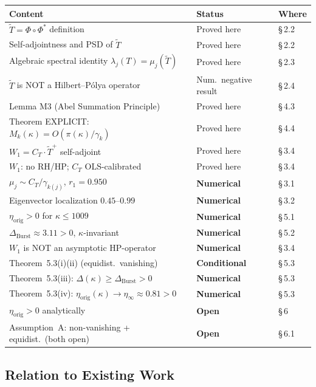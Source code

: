 \documentclass[11pt]{article}
\newcommand{\etaorig}{\eta_{\mathrm{orig}}}
\newcommand{\Tt}{\widetilde{T}}
\newcommand{\CT}{C_{T}}
\newcommand{\Wone}{W_1}
\newcommand{\Dburstvar}{\Delta_{\mathrm{Burst}}}
\begin{document}
\begin{center}
\renewcommand{\arraystretch}{1.3}
\begin{tabular}{lll}
\toprule
Content & Status & Where \\
\midrule
$\Tt = \Phi\circ\Phi^*$ definition & Proved here & \S\,2.2 \\
Self-adjointness and PSD of $\Tt$ & Proved here & \S\,2.2 \\
Algebraic spectral identity $\lambda_j(T)=\mu_j(\Tt)$ & Proved here & \S\,2.3 \\
$\Tt$ is NOT a Hilbert--P\'olya operator & Num.\ negative result & \S\,2.4 \\
Lemma M3 (Abel Summation Principle) & Proved here & \S\,4.3 \\
Theorem EXPLICIT: $M_k(\kappa)=O(\pi(\kappa)/\gamma_k)$ & Proved here & \S\,4.4 \\
$\Wone = \CT\cdot\Tt^+$ self-adjoint & Proved here & \S\,3.4 \\
$\Wone$: no RH/HP; $\CT$ OLS-calibrated & Proved here & \S\,3.4 \\
$\mu_j \sim \CT/\gamma_{k(j)}$, $r_1=0.950$ & \textbf{Numerical} & \S\,3.1 \\
Eigenvector localization $0.45$--$0.99$ & \textbf{Numerical} & \S\,3.2 \\
$\etaorig > 0$ for $\kappa\leq 1009$ & \textbf{Numerical} & \S\,5.1 \\
$\Dburstvar \approx 3.11 > 0$, $\kappa$-invariant & \textbf{Numerical} & \S\,5.2 \\
$\Wone$ is NOT an asymptotic HP-operator & \textbf{Numerical} & \S\,3.4 \\
Theorem~5.3(i)(ii) (equidist.\ vanishing) & \textbf{Conditional} & \S\,5.3 \\
Theorem~5.3(iii): $\Delta(\kappa)\geq\Dburstvar > 0$
  & \textbf{Numerical} & \S\,5.3 \\
Theorem~5.3(iv): $\etaorig(\kappa)\to\eta_\infty\approx 0.81 > 0$
  & \textbf{Numerical} & \S\,5.3 \\
$\etaorig > 0$ analytically & \textbf{Open} & \S\,6 \\
Assumption~A: non-vanishing + equidist.\ (both open)
  & \textbf{Open} & \S\,6.1 \\
\bottomrule
\end{tabular}
\end{center}

\subsection{Relation to Existing Work}
\end{document}
